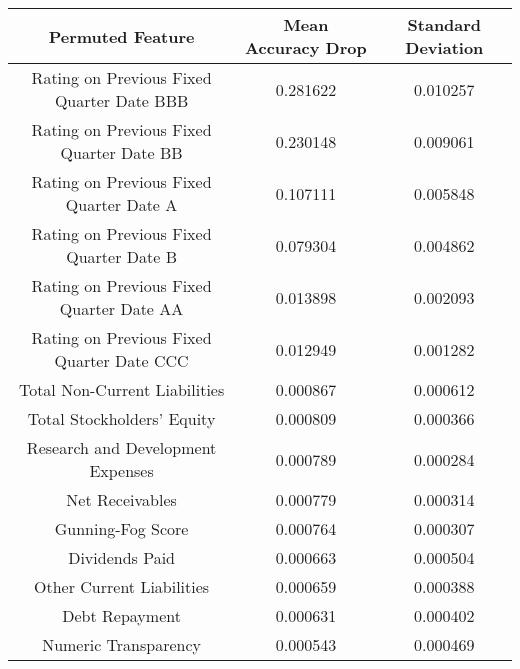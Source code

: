 \tiny
\begin{tabular}{ccc}
\toprule
Permuted Feature & Mean Accuracy Drop & Standard Deviation \\
\midrule
Rating on Previous Fixed Quarter Date BBB & 0.281622 & 0.010257 \\
Rating on Previous Fixed Quarter Date BB & 0.230148 & 0.009061 \\
Rating on Previous Fixed Quarter Date A & 0.107111 & 0.005848 \\
Rating on Previous Fixed Quarter Date B & 0.079304 & 0.004862 \\
Rating on Previous Fixed Quarter Date AA & 0.013898 & 0.002093 \\
Rating on Previous Fixed Quarter Date CCC & 0.012949 & 0.001282 \\
Total Non-Current Liabilities & 0.000867 & 0.000612 \\
Total Stockholders' Equity & 0.000809 & 0.000366 \\
Research and Development Expenses & 0.000789 & 0.000284 \\
Net Receivables & 0.000779 & 0.000314 \\
Gunning-Fog Score & 0.000764 & 0.000307 \\
Dividends Paid & 0.000663 & 0.000504 \\
Other Current Liabilities & 0.000659 & 0.000388 \\
Debt Repayment & 0.000631 & 0.000402 \\
Numeric Transparency & 0.000543 & 0.000469 \\
\bottomrule
\end{tabular}

\normalsize